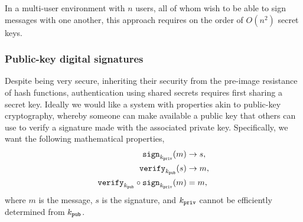 


In a multi-user environment with $n$ users, all of whom wish to be able to sign messages with one another, this approach requires on the order of $O(n^2)$ secret keys.

\subsubsection{Public-key digital signatures} \label{ref:public_key_dig_sig}

Despite being very secure, inheriting their security from the pre-image resistance of hash functions, authentication using shared secrets requires first sharing a secret key. Ideally we would like a system with properties akin to public-key cryptography, whereby someone can make available a public key that others can use to verify a signature made with the associated private key. Specifically, we want the following mathematical properties,
\begin{align}
{\tt sign}_{k_{\tt priv}}(m) &\to s, \nonumber\\
{\tt verify}_{k_{\tt pub}}(s) &\to m, \nonumber\\
{\tt verify}_{k_{\tt pub}} \circ {\tt sign}_{k_{\tt priv}}(m) &= m,
\end{align}
where $m$ is the message, $s$ is the signature, and $k_{\tt priv}$ cannot be efficiently determined from $k_{\tt pub}$.

